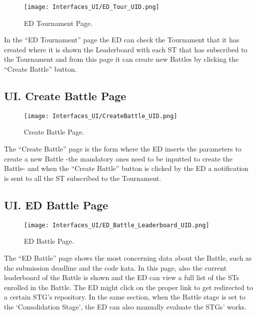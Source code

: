 \begin{figure}[H]
    \begin{center}
        \texttt{[image: Interfaces\_UI/ED\_Tour\_UID.png]}
        \caption{ED Tournament Page.}
        \label{fig:ed_tournament_page}%
    \end{center}   
\end{figure}

In the “ED Tournament” page the ED can check the Tournament that it has created where it is shown the Leaderboard with each ST that has subscribed to the Tournament and from this page it can create new Battles by clicking the “Create Battle” button.

\subsection*{UI\cui . Create Battle Page}

\begin{figure}[H]
    \begin{center}
        \texttt{[image: Interfaces\_UI/CreateBattle\_UID.png]}
        \caption{Create Battle Page.}
        \label{fig:create_battle_page}%
    \end{center}
\end{figure}

The “Create Battle” page is the form where the ED inserts the parameters to create a new Battle -the mandatory ones need to be inputted to create the Battle- and when the “Create Battle” button is clicked by the ED a notification is sent to all the ST subscribed to the Tournament.

\subsection*{UI\cui . ED Battle Page}

\begin{figure}[H]
    \begin{center}
        \texttt{[image: Interfaces\_UI/ED\_Battle\_Leaderboard\_UID.png]}
        \caption{ED Battle Page.}
        \label{fig:ed_battle_page}%
    \end{center}
\end{figure}

The “ED Battle” page shows the most concerning data about the Battle, such as the submission deadline and the code kata. In this page, also the current leaderboard of the Battle is shown and the ED can view a full list of the STs enrolled in the Battle. The ED might click on the proper link to get redirected to a certain STG’s repository. In the same section, when the Battle stage is set to the ‘Consolidation Stage’, the ED can also manually evaluate the STGs’ works.

